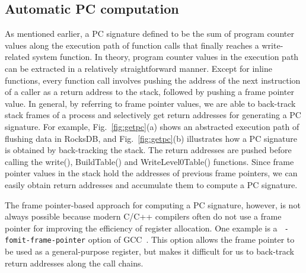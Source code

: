 

\subsection{Automatic PC computation}
As mentioned earlier, a PC signature defined to be the sum of program counter
values along the execution path of function calls that finally reaches a
write-related system function.  In theory, program counter values in the
execution path can be extracted in a relatively straightforward manner.  Except
for inline functions, every function call involves pushing the address of the
next instruction of a caller as a return address to the stack, followed by
pushing a frame pointer value.  In general, by referring to frame pointer
values, we are able to back-track stack frames of a process and selectively get
return addresses for generating a PC signature.  For example,
Fig.~\ref{fig:getpc}(a) shows an abstracted execution path of flushing data in
RocksDB, and Fig.~\ref{fig:getpc}(b) illustrates how a PC signature is obtained
by back-tracking the stack.  The return addresses are pushed before calling the
\textsf{\small  write()}, \textsf{\small  BuildTable()} and \textsf{\small
WriteLevel0Table()} functions.  Since frame pointer values in the stack hold
the addresses of previous frame pointers, we can easily obtain return addresses
and accumulate them to compute a PC signature.  

The frame pointer-based approach for computing a PC signature, however, is not
always possible because modern C/C++ compilers often do not use a frame pointer
for improving the efficiency of register allocation.  One example is a {\tt
-fomit-frame-pointer} option of GCC~\cite{GCC}.  This option allows the frame
pointer to be used as a general-purpose register, but makes it difficult for us
to back-track return addresses along the call chains.  

